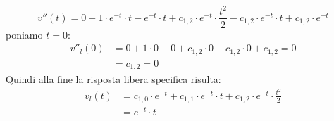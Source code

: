 \documentclass[a4paper]{article}
\begin{document}
\begin{example}
  \[
    v''(t) = 0 + 1 \cdot e^{-t} \cdot t - e^{-t} \cdot t + c_{1,2} \cdot e^{-t} \cdot \frac{t^2}{2} -
    c_{1,2} \cdot e^{-t} \cdot t + c_{1,2} \cdot e^{-t}
  \] 
  poniamo \( t = 0 \):
  \[
    \begin{aligned}
      v''_l(0) &= 0 + 1 \cdot 0 - 0 + c_{1,2} \cdot 0 - c_{1,2} \cdot 0 + c_{1,2} = 0\\
               &= c_{1,2} = 0
    \end{aligned}
  \] 
  Quindi alla fine la risposta libera specifica risulta:
  \[
    \begin{aligned}
      v_l(t) &= c_{1,0} \cdot e^{-t} + c_{1,1} \cdot e^{-t} \cdot t + c_{1,2} \cdot e^{-t} \cdot \frac{t^2}{2} \\
             &= e^{-t} \cdot t
    \end{aligned}
  \] 
\end{example}
\end{document}
